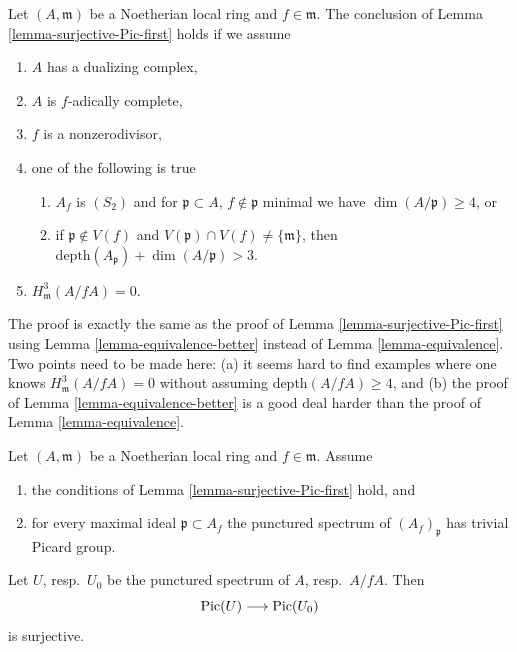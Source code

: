\begin{remark}
\label{remark-surjective-Pic-second}
Let $(A, \mathfrak m)$ be a Noetherian local ring and $f \in \mathfrak m$.
The conclusion of Lemma \ref{lemma-surjective-Pic-first} holds if we assume
\begin{enumerate}
\item $A$ has a dualizing complex,
\item $A$ is $f$-adically complete,
\item $f$ is a nonzerodivisor,
\item one of the following is true
\begin{enumerate}
\item $A_f$ is $(S_2)$ and for $\mathfrak p \subset A$,
$f \not \in \mathfrak p$ minimal we have $\dim(A/\mathfrak p) \geq 4$, or
\item if $\mathfrak p \not \in V(f)$ and
$V(\mathfrak p) \cap V(f) \not = \{\mathfrak m\}$, then
$\text{depth}(A_\mathfrak p) + \dim(A/\mathfrak p) > 3$.
\end{enumerate}
\item $H^3_{\mathfrak m}(A/fA) = 0$.
\end{enumerate}
The proof is exactly the same as the proof of
Lemma \ref{lemma-surjective-Pic-first}
using Lemma \ref{lemma-equivalence-better} instead of
Lemma \ref{lemma-equivalence}.
Two points need to be made here: (a)
it seems hard to find examples where one knows
$H^3_{\mathfrak m}(A/fA) = 0$ without assuming
$\text{depth}(A/fA) \geq 4$, and
(b) the proof of Lemma \ref{lemma-equivalence-better} is a
good deal harder than the proof of Lemma \ref{lemma-equivalence}.
\end{remark}

\begin{lemma}
\label{lemma-surjective-Pic-first-better}
Let $(A, \mathfrak m)$ be a Noetherian local ring and $f \in \mathfrak m$.
Assume
\begin{enumerate}
\item the conditions of Lemma \ref{lemma-surjective-Pic-first} hold, and
\item for every maximal ideal $\mathfrak p \subset A_f$
the punctured spectrum of $(A_f)_\mathfrak p$ has trivial Picard group.
\end{enumerate}
Let $U$, resp.\ $U_0$ be the punctured spectrum of $A$, resp.\ $A/fA$.
Then
$$
\mathop{\mathrm{Pic}}\nolimits(U) \longrightarrow \mathop{\mathrm{Pic}}\nolimits(U_0)
$$
is surjective.
\end{lemma}

